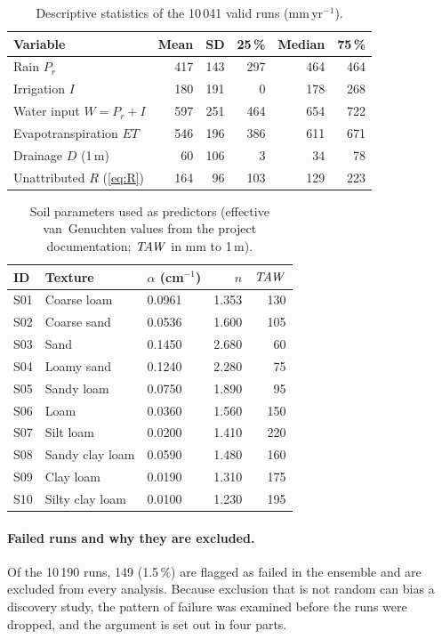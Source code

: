 \begin{table}[H]\centering\small
\caption{Descriptive statistics of the 10\,041 valid runs (mm\,yr$^{-1}$).}
\label{tab:desc}
\begin{tabular}{lrrrrr}
\toprule
Variable & Mean & SD & 25\,\% & Median & 75\,\%\\\midrule
Rain $P_r$ & 417 & 143 & 297 & 464 & 464\\
Irrigation $I$ & 180 & 191 & 0 & 178 & 268\\
Water input $W=P_r+I$ & 597 & 251 & 464 & 654 & 722\\
Evapotranspiration $\mathit{ET}$ & 546 & 196 & 386 & 611 & 671\\
Drainage $D$ (1\,m) & 60 & 106 & 3 & 34 & 78\\
Unattributed $R$ (\cref{eq:R}) & 164 & 96 & 103 & 129 & 223\\\bottomrule
\end{tabular}
\end{table}

\begin{table}[H]\centering\small
\caption{Soil parameters used as predictors (effective van~Genuchten values from the project documentation; $\mathit{TAW}$ in mm to 1\,m).}
\label{tab:soilsP2}
\begin{tabular}{lllrr}
\toprule
ID & Texture & $\alpha$ (cm$^{-1}$) & $n$ & $\mathit{TAW}$\\\midrule
S01 & Coarse loam & 0.0961 & 1.353 & 130\\
S02 & Coarse sand & 0.0536 & 1.600 & 105\\
S03 & Sand & 0.1450 & 2.680 & 60\\
S04 & Loamy sand & 0.1240 & 2.280 & 75\\
S05 & Sandy loam & 0.0750 & 1.890 & 95\\
S06 & Loam & 0.0360 & 1.560 & 150\\
S07 & Silt loam & 0.0200 & 1.410 & 220\\
S08 & Sandy clay loam & 0.0590 & 1.480 & 160\\
S09 & Clay loam & 0.0190 & 1.310 & 175\\
S10 & Silty clay loam & 0.0100 & 1.230 & 195\\\bottomrule
\end{tabular}
\end{table}

\paragraph{Failed runs and why they are excluded.}
\label{sec:failed}
Of the 10\,190 runs, 149 (1.5\,\%) are flagged as failed in the ensemble and are excluded from every analysis. Because exclusion that is not random can bias a discovery study, the pattern of failure was examined before the runs were dropped, and the argument is set out in four parts.

